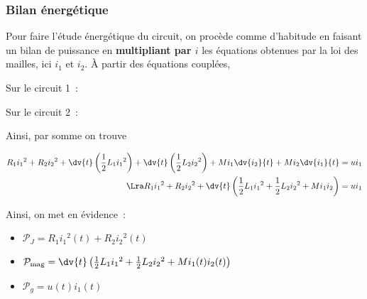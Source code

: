 \documentclass[../main/main.tex]{subfiles}
\begin{document}
\subsubsection{Bilan énergétique}
\label{ssec:cplnrj}
Pour faire l'étude énergétique du circuit, on procède comme d'habitude en
faisant un bilan de puissance en \textbf{multipliant par $i$} les équations
obtenues par la loi des mailles, ici $i_1$ et $i_2$. À partir des équations
couplées,
\smallbreak
\noindent
\begin{minipage}[t]{.5\linewidth}
	\begin{center}
		Sur le circuit 1~:
	\end{center}
	\vspace*{-10pt}
\end{minipage}
\hfill
\begin{minipage}[t]{.5\linewidth}
	\begin{center}
		Sur le circuit 2~:
	\end{center}
	\vspace*{-10pt}
\end{minipage}
\bigbreak
\noindent
Ainsi, par somme on trouve
\begin{hide}
	\begin{align*}
		R_1i_1{}^{2} +R_2i_2{}^{2} +
		\dv{t}\left( \frac{1}{2} L_1i_1{}^{2} \right) +
		\dv{t}\left( \frac{1}{2}L_2i_2{}^{2} \right) +
		Mi_1 \dv{i_2}{t} + Mi_2 \dv{i_1}{t} =
		ui_1
		\\\Lra
		R_1i_1{}^{2} +R_2i_2{}^{2} +
		\dv{t}\left(
		\frac{1}{2}L_1i_1{}^{2} + \frac{1}{2}L_2i_2{}^{2} + Mi_1i_2
		\right) =
		ui_1
	\end{align*}
\end{hide}
\noindent
Ainsi, on met en évidence~:
\begin{itemize}[label=$\diamond$, leftmargin=10pt]
	\item $\mathcal{P}_{J} = R_1i_1{}^{2}(t) + R_2i_2{}^{2}(t)$
	\item $\mathcal{P}_{\rm mag} = \dv{t}
		      \left(
		      \frac{1}{2}L_1i_1{}^{2} + \frac{1}{2}L_2i_2{}^{2} + Mi_1(t)i_2(t)
		      \right)$
	\item $\mathcal{P}_{g} = u(t)i_1(t)$
\end{itemize}
\end{document}
